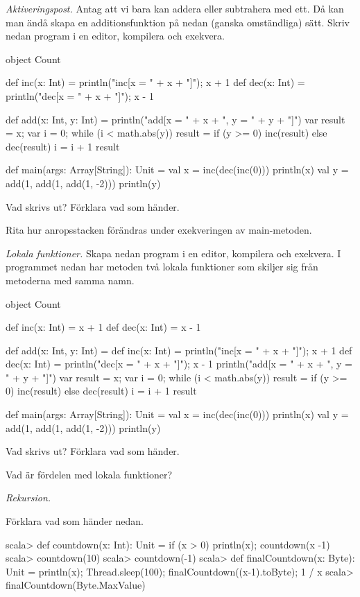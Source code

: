 \Task \emph{Aktiveringspost.} Antag att vi bara kan addera eller subtrahera med ett. Då kan man ändå skapa en additionsfunktion på nedan (ganska omständliga) sätt. Skriv nedan program i en editor, kompilera och exekvera. 
\begin{Code}
object Count {
  def inc(x: Int) = {println("inc[x = " + x + "]"); x + 1}
  def dec(x: Int) = {println("dec[x = " + x + "]"); x - 1}

  def add(x: Int, y: Int) = {
    println("add[x = " + x + ", y = " + y + "]")
    var result = x; 
    var i = 0; 
    while (i < math.abs(y)){
      result = if (y >= 0) inc(result) else dec(result)
      i = i + 1
    }
    result
  }

  def main(args: Array[String]): Unit = {
    val x =  inc(dec(inc(0)))
    println(x)
    val y = add(1, add(1, add(1, -2)))
    println(y)
  }
}
\end{Code}

\Subtask Vad skrivs ut? Förklara vad som händer.

\Subtask\Pen Rita hur anropsstacken förändras under exekveringen av main-metoden.


\Task \emph{Lokala funktioner.} Skapa nedan program i en editor, kompilera och exekvera. I programmet nedan har metoden  två lokala funktioner som skiljer sig från metoderna med samma namn. 
\begin{Code}
object Count {
  def inc(x: Int) = x + 1
  def dec(x: Int) = x - 1

  def add(x: Int, y: Int) = {
    def inc(x: Int) = {println("inc[x = " + x + "]"); x + 1}
    def dec(x: Int) = {println("dec[x = " + x + "]"); x - 1}
    println("add[x = " + x + ", y = " + y + "]")
    var result = x; 
    var i = 0; 
    while (i < math.abs(y)){
      result = if (y >= 0) inc(result) else dec(result)
      i = i + 1
    }
    result
  }

  def main(args: Array[String]): Unit = {
    val x =  inc(dec(inc(0)))
    println(x)
    val y = add(1, add(1, add(1, -2)))
    println(y)
  }
}
\end{Code}

\Subtask Vad skrivs ut? Förklara vad som händer.

\Subtask\Pen Vad är fördelen med lokala funktioner?



\Task \emph{Rekursion.} 

\Subtask Förklara vad som händer nedan. 

\begin{REPL}
scala> def countdown(x: Int): Unit = if (x > 0) {println(x); countdown(x -1)}
scala> countdown(10)
scala> countdown(-1)
scala> def finalCountdown(x: Byte): Unit = 
         {println(x); Thread.sleep(100); finalCountdown((x-1).toByte); 1 / x}
scala> finalCountdown(Byte.MaxValue)
\end{REPL}

